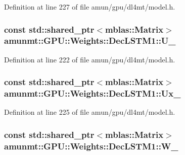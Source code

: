 Definition at line 227 of file amun/gpu/dl4mt/model.\+h.

\subsubsection[{\texorpdfstring{U\+\_\+}{U_}}]{\setlength{\rightskip}{0pt plus 5cm}const std\+::shared\+\_\+ptr$<${\bf mblas\+::\+Matrix}$>$ amunmt\+::\+G\+P\+U\+::\+Weights\+::\+Dec\+L\+S\+T\+M1\+::\+U\+\_\+}\hypertarget{structamunmt_1_1GPU_1_1Weights_1_1DecLSTM1_adbc5681037f5ea847bccb8bb4acf2912}{}\label{structamunmt_1_1GPU_1_1Weights_1_1DecLSTM1_adbc5681037f5ea847bccb8bb4acf2912}


Definition at line 222 of file amun/gpu/dl4mt/model.\+h.

\subsubsection[{\texorpdfstring{Ux\+\_\+}{Ux_}}]{\setlength{\rightskip}{0pt plus 5cm}const std\+::shared\+\_\+ptr$<${\bf mblas\+::\+Matrix}$>$ amunmt\+::\+G\+P\+U\+::\+Weights\+::\+Dec\+L\+S\+T\+M1\+::\+Ux\+\_\+}\hypertarget{structamunmt_1_1GPU_1_1Weights_1_1DecLSTM1_abc72690d65a7ed0dbd8d9a36027a40ce}{}\label{structamunmt_1_1GPU_1_1Weights_1_1DecLSTM1_abc72690d65a7ed0dbd8d9a36027a40ce}


Definition at line 225 of file amun/gpu/dl4mt/model.\+h.

\subsubsection[{\texorpdfstring{W\+\_\+}{W_}}]{\setlength{\rightskip}{0pt plus 5cm}const std\+::shared\+\_\+ptr$<${\bf mblas\+::\+Matrix}$>$ amunmt\+::\+G\+P\+U\+::\+Weights\+::\+Dec\+L\+S\+T\+M1\+::\+W\+\_\+}\hypertarget{structamunmt_1_1GPU_1_1Weights_1_1DecLSTM1_a14ad4a0efd22919d5e5fd67f95e0014a}{}\label{structamunmt_1_1GPU_1_1Weights_1_1DecLSTM1_a14ad4a0efd22919d5e5fd67f95e0014a}


